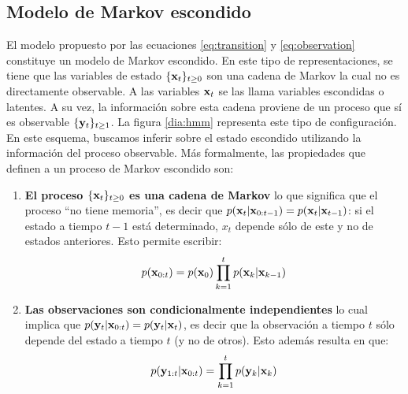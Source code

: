 \subsection{Modelo de Markov escondido}

El modelo propuesto por las ecuaciones \ref{eq:transition} y \ref{eq:observation} constituye un modelo de Markov escondido. En este tipo de representaciones, se tiene que las variables de estado $\{\mathbf{x}_t\}_{t \ge 0}$ son una cadena de Markov la cual no es directamente observable. A las variables $\mathbf{x}_t$ se las llama variables escondidas o latentes. A su vez, la información sobre esta cadena proviene de un proceso que sí es observable $\{\mathbf{y}_t\}_{t \ge 1}$. La figura \ref{dia:hmm} representa este tipo de configuración. En este esquema, buscamos inferir sobre el estado escondido utilizando la información del proceso observable. Más formalmente, las propiedades que definen a un proceso de Markov escondido son: 
\begin{enumerate}
    \item \textbf{El proceso $\{\mathbf{x}_t\}_{t \ge 0}$ es una cadena de Markov} lo que significa que el proceso ``no tiene memoria'', es decir que $p(\mathbf{x}_t | \mathbf{x}_{0:t-1}) = p(\mathbf{x}_t | \mathbf{x}_{t-1})$: si el estado a tiempo $t-1$ está determinado, $x_t$ depende sólo de este y no de estados anteriores. Esto permite escribir:
    \begin{align*}
        p(\mathbf{x}_{0:t}) = p(\mathbf{x}_0) \prod_{k=1}^{t} p(\mathbf{x}_k | \mathbf{x}_{k-1})
    \end{align*}
    \item \textbf{Las observaciones son condicionalmente independientes}  lo cual implica que $p(\mathbf{y}_t | \mathbf{x}_{0:t}) = p(\mathbf{y}_t | \mathbf{x}_t)$, es decir que la observación a tiempo $t$ sólo depende del estado a tiempo $t$ (y no de otros). Esto además resulta en que:
    \begin{align*}
        p(\mathbf{y}_{1:t} | \mathbf{x}_{0:t}) = \prod_{k=1}^{t} p(\mathbf{y}_k | \mathbf{x}_k)
    \end{align*}
\end{enumerate}

